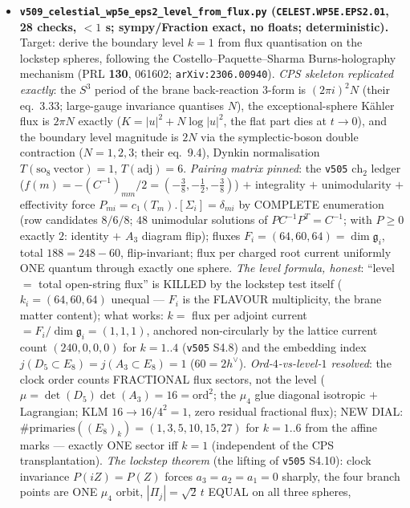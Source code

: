 \documentclass[11pt]{article}
\begin{document}
\begin{itemize}[leftmargin=1.5em]
\item \textbf{\texttt{v509\_celestial\_wp5e\_eps2\_level\_from\_flux.py} (\texttt{CELEST.WP5E.EPS2.01},
28 checks, $<1$ s; sympy/Fraction exact, no floats; deterministic).} Target: derive the boundary
level $k=1$ from flux quantisation on the lockstep spheres, following the
Costello--Paquette--Sharma Burns-holography mechanism (PRL \textbf{130}, 061602;
\texttt{arXiv:2306.00940}). \emph{CPS skeleton replicated exactly}: the $S^3$ period of the brane
back-reaction $3$-form is $(2\pi i)^2N$ (their eq.~3.33; large-gauge invariance quantises $N$),
the exceptional-sphere K\"ahler flux is $2\pi N$ exactly ($K=|u|^2{+}N\log|u|^2$, the flat part
dies at $t\to0$), and the boundary level magnitude is $2N$ via the symplectic-boson double
contraction ($N=1,2,3$; their eq.~9.4), Dynkin normalisation $T(\text{so}_8\ \text{vector})=1$,
$T(\text{adj})=6$. \emph{Pairing matrix pinned}: the \texttt{v505} $\mathrm{ch}_2$ ledger
($f(m)=-(C^{-1})_{mm}/2=(-\tfrac38,-\tfrac12,-\tfrac38)$) $+$ integrality $+$ unimodularity $+$
effectivity force $P_{mi}=c_1(T_m).[\Sigma_i]=\delta_{mi}$ by COMPLETE enumeration (row candidates
$8/6/8$; $48$ unimodular solutions of $PC^{-1}P^T=C^{-1}$; with $P\ge0$ exactly $2$: identity $+$
$A_3$ diagram flip); fluxes $F_i=(64,60,64)=\dim\mathfrak g_i$, total $188=248-60$,
flip-invariant; flux per charged root current uniformly ONE quantum through exactly one sphere.
\emph{The level formula, honest}: ``level $=$ total open-string flux'' is KILLED by the lockstep
test itself ($k_i=(64,60,64)$ unequal --- $F_i$ is the FLAVOUR multiplicity, the brane matter
content); what works: $k=$ flux per adjoint current $=F_i/\dim\mathfrak g_i=(1,1,1)$, anchored
non-circularly by the lattice current count $(240,0,0,0)$ for $k=1..4$ (\texttt{v505} S4.8) and
the embedding index $j(D_5{\subset}E_8)=j(A_3{\subset}E_8)=1$ ($60=2h^\vee$).
\emph{Ord-$4$-vs-level-$1$ resolved}: the clock order counts FRACTIONAL flux sectors, not the
level ($\mu=\det(D_5)\det(A_3)=16=\mathrm{ord}^2$; the $\mu_4$ glue diagonal isotropic $+$
Lagrangian; KLM $16\to16/4^2=1$, zero residual fractional flux); NEW DIAL:
$\#\mathrm{primaries}((E_8)_k)=(1,3,5,10,15,27)$ for $k=1..6$ from the affine marks --- exactly
ONE sector iff $k=1$ (independent of the CPS transplantation). \emph{The lockstep theorem} (the
lifting of \texttt{v505} S4.10): clock invariance $P(iZ)=P(Z)$ forces $a_3=a_2=a_1=0$ sharply,
the four branch points are ONE $\mu_4$ orbit, $|\Pi_j|=\sqrt2\,t$ EQUAL on all three spheres,

\end{itemize}
\end{document}
